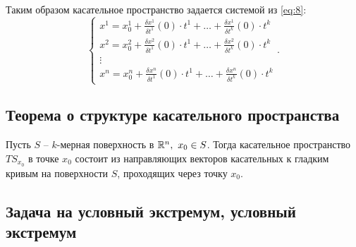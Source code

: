 \begin{definition}
    Таким образом касательное пространство задается системой из \ref{eq:8}:
    \[
        \left\{\begin{array}{l}
            x^1 = x^1_0 + \frac{\delta x^1}{\delta t^1} (0)\cdot t^1 + \ldots + \frac{\delta x^1}{\delta t^k}(0)\cdot t^k \\
            x^2 = x^2_0 + \frac{\delta x^2}{\delta t^1} (0)\cdot t^1 + \ldots + \frac{\delta x^2}{\delta t^k}(0)\cdot t^k \\
            \vdots                                                                                                        \\
            x^n = x^n_0 + \frac{\delta x^n}{\delta t^1} (0)\cdot t^1 + \ldots + \frac{\delta x^n}{\delta t^k}(0)\cdot t^k
        \end{array}\right..
    \]
\end{definition}

\subsection{Теорема о структуре касательного пространства}

\begin{theorem}\label{theorem:2}
    Пусть $S$ -- $k$-мерная поверхность в $\mathbb{R}^n, \ x_0 \in S$. Тогда касательное пространство $TS_{x_0}$ в точке $x_0$ состоит из направляющих векторов касательных к гладким кривым на поверхности $S$, проходящих через точку $x_0$.
\end{theorem}

\subsection{Задача на условный экстремум, условный экстремум}

